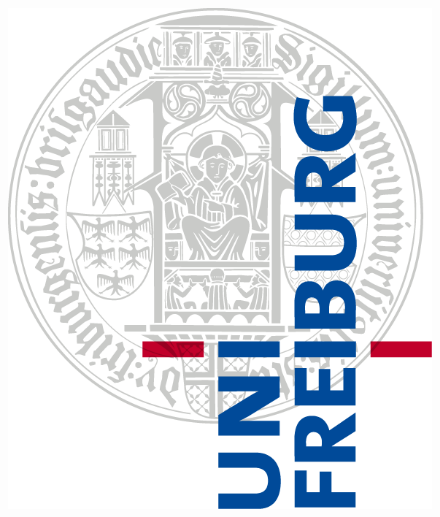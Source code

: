 


%


\thispagestyle{empty}


\begin{figure}[t]
 \begin{flushright}
 \includegraphics{abb/unilogo}
 \end{flushright}
\end{figure}

\begin{verbatim}

\end{verbatim}

